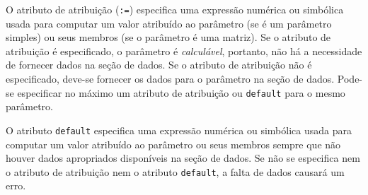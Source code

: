\documentclass[11pt, brazil]{report}
\begin{document}
O atributo de atribuição ({\tt:=}) especifica uma expressão numérica
ou simbólica usada para \linebreak computar um valor atribuído ao parâmetro
(se é um parâmetro simples) ou seus membros (se o parâmetro é uma matriz).
Se o atributo de atribuição é especificado,
o parâmetro é {\it calculável}, \linebreak portanto, não há a necessidade de fornecer
dados na seção de dados. Se o atributo de atribuição não é especificado,
deve-se fornecer os dados para o parâmetro na seção de dados. Pode-se especificar no
máximo um atributo de atribuição ou {\tt default} para o mesmo parâmetro.

O atributo {\tt default} especifica uma expressão numérica ou simbólica
usada para computar um valor atribuído ao parâmetro ou seus membros
sempre que não houver dados apropriados disponíveis na seção de dados.
Se não se especifica nem o atributo de atribuição nem o atributo
{\tt default}, a falta de dados causará um erro.

%
%
%
\end{document}
